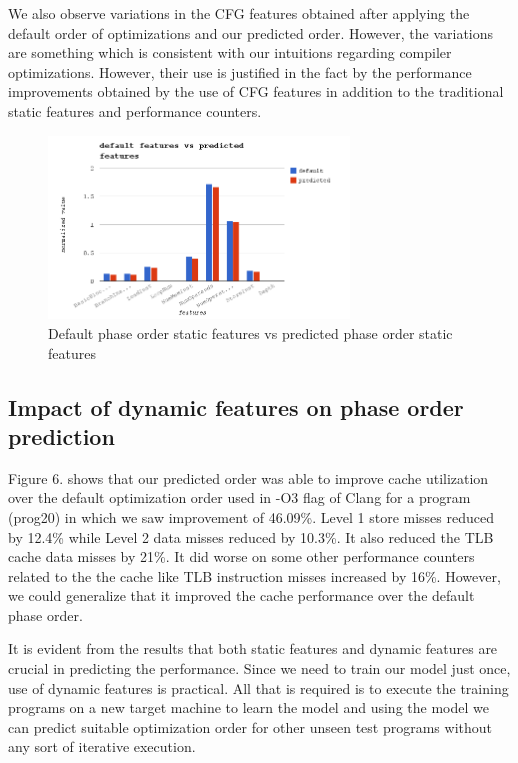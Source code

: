 \documentclass[10pt]{sigplanconf}
\begin{document}
We also observe variations in the CFG features obtained after applying the default order of optimizations and our predicted order. However, the variations are something which is consistent with our intuitions regarding compiler optimizations. However, their use is justified in the fact by the performance improvements obtained by the use of CFG features in addition to the traditional static features and performance counters.   

\begin{figure}[ht!]
\centering
\includegraphics[width=80mm]{default_pred.png}
\caption{ Default phase order static features vs predicted phase order static features}
\label{overflow}
\end{figure}


\subsection { Impact of dynamic features on phase order prediction }

Figure 6. shows that our predicted order was able to improve cache utilization over the default optimization order used in -O3 flag of Clang for a program (prog20) in which we saw improvement of 46.09\%. Level 1 store misses reduced by 12.4\% while Level 2 data misses reduced by 10.3\%. It also reduced the TLB cache data misses by 21\%. It did worse on some other performance counters related to the the cache like TLB instruction misses increased by 16\%. However, we could generalize that it improved the cache performance over the default phase order. 

It is evident from the results that both static features and dynamic features are crucial in predicting the performance. Since we need to train our model just once, use of dynamic features is practical. All that is required is to execute the training programs on a new target machine to learn the model and using the model we can predict suitable optimization order for other unseen test programs without any sort of iterative execution. 
\end{document}
